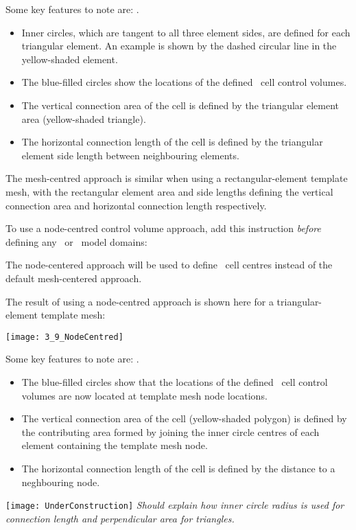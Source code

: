 Some key features to note are:
    \label{page:MeshCentredApproach}
    \label{page:MeshCentredApproach}.
\begin{itemize}
    \item Inner circles, which are tangent to all three element sides, are defined for each triangular element.  An example is shown by the dashed circular line in the yellow-shaded element.
    \item The blue-filled circles show the locations of the defined \mf\ cell control volumes.
    \item The vertical connection area of the cell is defined by the triangular element area (yellow-shaded triangle).
    \item The horizontal connection length of the cell is defined by the triangular element side length between neighbouring elements.
\end{itemize}

The mesh-centred approach is similar when using a  rectangular-element template mesh, with the rectangular element area and side lengths defining the vertical connection area and horizontal connection length respectively.

\pagebreak
To use a node-centred control volume approach, add this instruction {\em before} defining any \gwf\ or \swf\ model domains:

    {The node-centered approach will be used to define \mf\ cell centres instead of the default mesh-centered approach.
     }

The result of using a node-centred approach is shown here for a triangular-element template mesh:

    \texttt{[image: 3\_9\_NodeCentred]}

Some key features to note are:
    \label{page:NodeCentredApproach}
    \label{page:NodeCentredApproach}.
\begin{itemize}
    \item The blue-filled circles show that the locations of the defined \mf\ cell control volumes are now located at template mesh node locations.
    \item The vertical connection area of the cell (yellow-shaded polygon) is defined by the contributing area formed by joining the inner circle centres of each element containing the template mesh node.         \label{page:NodeCentredApproach}
    \item The horizontal connection length of the cell is defined by the distance to a neghbouring node.
\end{itemize}

\texttt{[image: UnderConstruction]} \textit{Should explain how inner circle radius is used for connection length and perpendicular area for triangles.}



